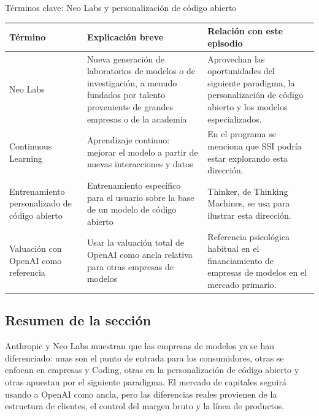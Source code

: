 \begin{knowledgebox}{Términos clave: Neo Labs y personalización de código abierto}
\begin{tabularx}{\textwidth}{p{}p{}X}
\toprule
Término & Explicación breve & Relación con este episodio \\
\midrule
Neo Labs & Nueva generación de laboratorios de modelos o de investigación, a menudo fundados por talento proveniente de grandes empresas o de la academia & Aprovechan las oportunidades del siguiente paradigma, la personalización de código abierto y los modelos especializados. \\
Continuous Learning & Aprendizaje continuo: mejorar el modelo a partir de nuevas interacciones y datos & En el programa se menciona que SSI podría estar explorando esta dirección. \\
Entrenamiento personalizado de código abierto & Entrenamiento específico para el usuario sobre la base de un modelo de código abierto & Thinker, de Thinking Machines, se usa para ilustrar esta dirección. \\
Valuación con OpenAI como referencia & Usar la valuación total de OpenAI como ancla relativa para otras empresas de modelos & Referencia psicológica habitual en el financiamiento de empresas de modelos en el mercado primario. \\
\bottomrule
\end{tabularx}
\end{knowledgebox}

\subsection{Resumen de la sección}

Anthropic y Neo Labs muestran que las empresas de modelos ya se han diferenciado: unas son el punto de entrada para los consumidores, otras se enfocan en empresas y Coding, otras en la personalización de código abierto y otras apuestan por el siguiente paradigma. El mercado de capitales seguirá usando a OpenAI como ancla, pero las diferencias reales provienen de la estructura de clientes, el control del margen bruto y la línea de productos.
